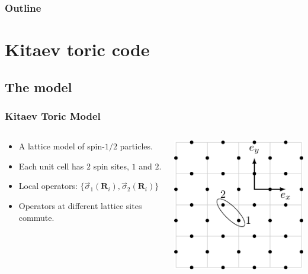 \documentclass{beamer}
\renewcommand{\(}{\left(}
\renewcommand{\)}{\right)}
\renewcommand{\[}{\left[}
\renewcommand{\]}{\right]}
\begin{document}
\begin{frame}
    \frametitle{Outline}

    \tableofcontents

\end{frame}

\section{Kitaev toric code}
\subsection{The model}
\begin{frame}
    \frametitle{Kitaev Toric Model}
    \begin{columns}
        \begin{column}{0.67\textwidth}
            \begin{itemize}
                \item A lattice model of spin-$1/2$ particles.
                \item Each unit cell has $2$ spin sites, $1$ and $2$.
                \item Local operators: $\{\vec{\sigma}_{1}(\bm R_i), \vec{\sigma}_{2}(\bm R_i)\}$
                \item Operators at different lattice sites commute.
            \end{itemize} 
        \end{column}
        \begin{column}{0.33\textwidth}
            \centering
            \includegraphics[scale=0.8]{spin_grid.pdf}
        \end{column}
    \end{columns}
    \pause
    \vspace{8pt}
    \begin{columns}
        \begin{column}{0.62\textwidth}

\end{column}
\end{columns}
\end{frame}
\end{document}
